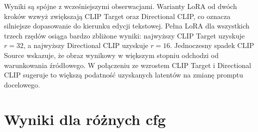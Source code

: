 \documentclass[
    left=2.5cm,
    right=2.5cm,
    top=2.5cm,
    bottom=3cm,
    bindingoffset=6mm,
    nohyphenation=false
]{szablon/eiti/sprawozdanie}
\begin{document}
Wyniki są spójne z wcześniejszymi obserwacjami.
Warianty LoRA od dwóch kroków wzwyż zwiększają CLIP Target oraz Directional
CLIP, co oznacza silniejsze dopasowanie do kierunku edycji tekstowej. Pełna
LoRA dla wszystkich trzech rzędów osiąga bardzo zbliżone wyniki: najwyższy
CLIP Target uzyskuje $r=32$, a najwyższy Directional CLIP uzyskuje $r=16$.
Jednoczesny spadek CLIP Source wskazuje, że obraz wynikowy w większym
stopniu odchodzi od warunkowania źródłowego. W połączeniu ze wzrostem CLIP
Target i Directional CLIP sugeruje to większą podatność uzyskanych latentów
na zmianę promptu docelowego.


\section{Wyniki dla różnych cfg}

\begin{table}[H]
    \centering
    \caption{Wyniki dla roznych wartosci CFG.}
    \label{tab:cfg-sweep-matched-reconstruction}
\end{table}
\end{document}
